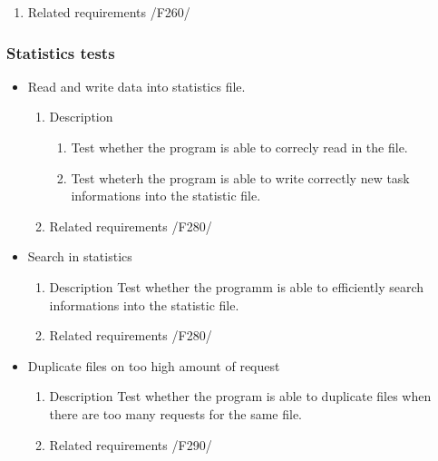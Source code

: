 {\begin{itemize}
\begin{enumerate}
					\item Related requirements\newline
					/F260/
				\end{enumerate}
		\end{itemize}
		\subsubsection{Statistics tests}
		\begin{itemize}
		
		
		
				\item Read and write data into statistics file.
				\begin{enumerate}
					\item Description\newline
					\begin{enumerate}
					
					\item 
Test whether the program is able to correcly read in the file.
					\item
Test wheterh the program is able to write correctly new task informations into the statistic file.
					\end{enumerate}
					\item Related requirements\newline
					/F280/
					
				\end{enumerate}
				
				
				\item Search in statistics
				\begin{enumerate}
					\item Description\newline
Test whether the programm is able to efficiently search informations into the statistic file. 
					\item Related requirements\newline
					/F280/
				\end{enumerate}
				
				
				\item Duplicate files on too high amount of request
				\begin{enumerate}
					\item Description\newline
Test whether the program is able to duplicate files when there are too many requests for the same file.
					\item Related requirements\newline
					/F290/
				\end{enumerate}
				

\end{itemize}}
